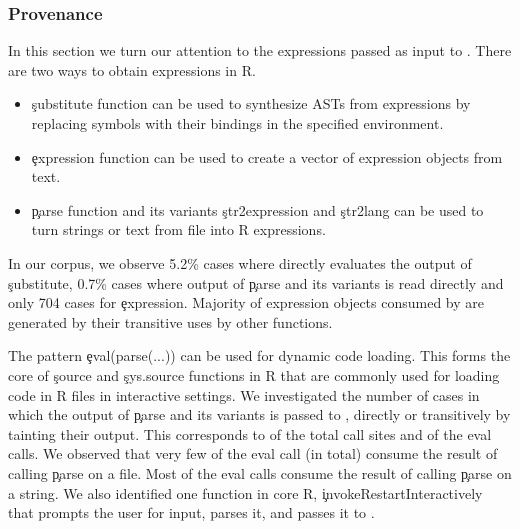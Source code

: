 \documentclass[conference]{IEEEtran}
\begin{document}
\subsubsection{Provenance}

In this section we turn our attention to the \AllExpressionInputEvalCallPerc
expressions passed as input to \eval. There are two ways to obtain
expressions in R.
\begin{itemize}
  \item \c{substitute} function can be used to synthesize ASTs from
  expressions by replacing symbols with their bindings in the specified
  environment.
  \item \c{expression} function can be used to create a vector of expression
    objects from text.
  \item \c{parse} function and its variants \c{str2expression} and \c{str2lang}
    can be used to turn strings or text from file into R expressions.
\end{itemize}

In our corpus, we observe 5.2\% cases where \eval directly evaluates the output of
\c{substitute}, 0.7\% cases where output of \c{parse} and its variants is read
directly and only 704 cases for \c{expression}. Majority of expression objects
consumed by \eval are generated by their transitive uses by other functions.

The pattern \c{eval(parse(...))} can be used for dynamic code loading. This
forms the core of \c{source} and \c{sys.source} functions in R that are commonly
used for loading code in R files in interactive settings. We investigated the
number of cases in which the output of \c{parse} and its variants is passed to
\eval, directly or transitively by tainting their output. This corresponds to \PercentParsedCallSites of the total \eval call sites and
\PercentParsedEvals of the eval calls. We observed that
very few of the eval call (\NbParseFilesRnd in total) consume the result of calling \c{parse} on
a file. Most of the eval calls consume the result of calling
\c{parse} on a string.  We also identified one
function in core R, \c{invokeRestartInteractively} that prompts the user for
input, parses it, and passes it to \eval.
\end{document}
